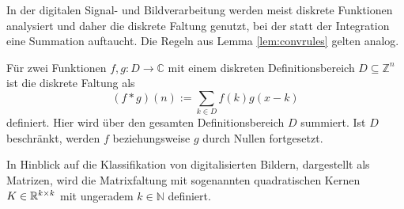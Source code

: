 
In der digitalen Signal- und Bildverarbeitung werden meist diskrete Funktionen analysiert und daher die diskrete Faltung genutzt, bei der statt der Integration eine Summation auftaucht. Die Regeln aus Lemma \ref{lem:convrules} gelten analog.

\begin{defi}\label{disk_faltung}
    Für zwei Funktionen $f,g: D \rightarrow \mathbb{C}$ mit einem diskreten Definitionsbereich $D \subseteq \mathbb{Z}^n$ ist die diskrete Faltung als
    \begin{equation*}
        (f \ast g) (n) := \sum_{k \in D} f(k) g(x-k)
    \end{equation*}
    definiert. Hier wird über den gesamten Definitionsbereich $D$ summiert. Ist $D$ beschränkt, werden $f$ beziehungsweise $g$ durch Nullen fortgesetzt.  
\end{defi}

In Hinblick auf die Klassifikation von digitalisierten Bildern, dargestellt als Matrizen, wird die Matrixfaltung mit sogenannten quadratischen Kernen $K \in \mathbb{R}^{k \times k}$ mit ungeradem $k \in \mathbb{N}$ definiert.
 


